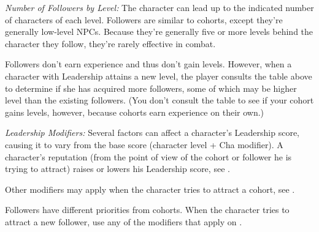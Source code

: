 {\textit{Number of Followers by Level:} The character can lead up to the indicated number of characters of each level. Followers are similar to cohorts, except they're generally low-level NPCs. Because they're generally five or more levels behind the character they follow, they're rarely effective in combat.

Followers don't earn experience and thus don't gain levels. However, when a character with Leadership attains a new level, the player consults the table above to determine if she has acquired more followers, some of which may be higher level than the existing followers. (You don't consult the table to see if your cohort gains levels, however, because cohorts earn experience on their own.)

\textit{Leadership Modifiers:} Several factors can affect a character's Leadership score, causing it to vary from the base score (character level + Cha modifier). A character's reputation (from the point of view of the cohort or follower he is trying to attract) raises or lowers his Leadership score, see .


Other modifiers may apply when the character tries to attract a cohort, see .


Followers have different priorities from cohorts. When the character tries to attract a new follower, use any of the modifiers that apply on .

}


